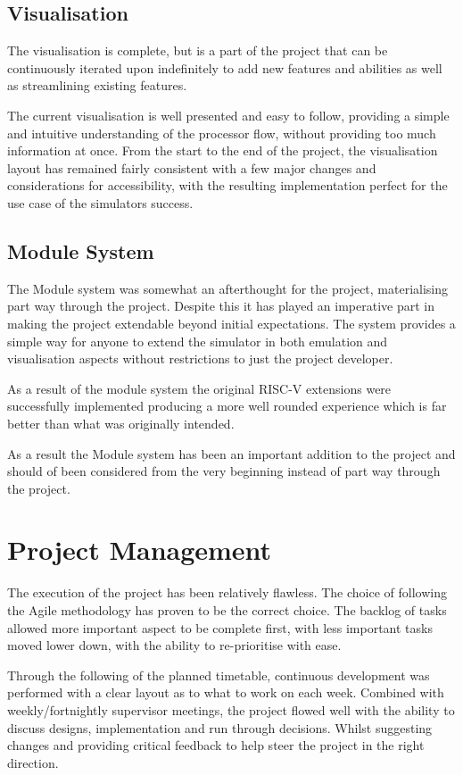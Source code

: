 \subsection{Visualisation}
The visualisation is complete, but is a part of the project that can be continuously iterated upon indefinitely to add new features and abilities as well as streamlining existing features.

The current visualisation is well presented and easy to follow, providing a simple and intuitive understanding of the processor flow, without providing too much information at once. From the start to the end of the project, the visualisation layout has remained fairly consistent with a few major changes and considerations for accessibility, with the resulting implementation perfect for the use case of the simulators success.

\subsection{Module System}
The Module system was somewhat an afterthought for the project, materialising part way through the project. Despite this it has played an imperative part in making the project extendable beyond initial expectations. The system provides a simple way for anyone to extend the simulator in both emulation and visualisation aspects without restrictions to just the project developer.

As a result of the module system the original RISC-V extensions were successfully implemented producing a more well rounded experience which is far better than what was originally intended. 

As a result the Module system has been an important addition to the project and should of been considered from the very beginning instead of part way through the project. 

\section{Project Management}
The execution of the project has been relatively flawless. The choice of following the Agile \cite{atlassian_2022_what} methodology has proven to be the correct choice. The backlog of tasks allowed more important aspect to be complete first, with less important tasks moved lower down, with the ability to re-prioritise with ease.

Through the following of the planned timetable, continuous development was performed with a clear layout as to what to work on each week. Combined with weekly/fortnightly supervisor meetings, the project flowed well with the ability to discuss designs, implementation and run through decisions. Whilst suggesting changes and providing critical feedback to help steer the project in the right direction.

